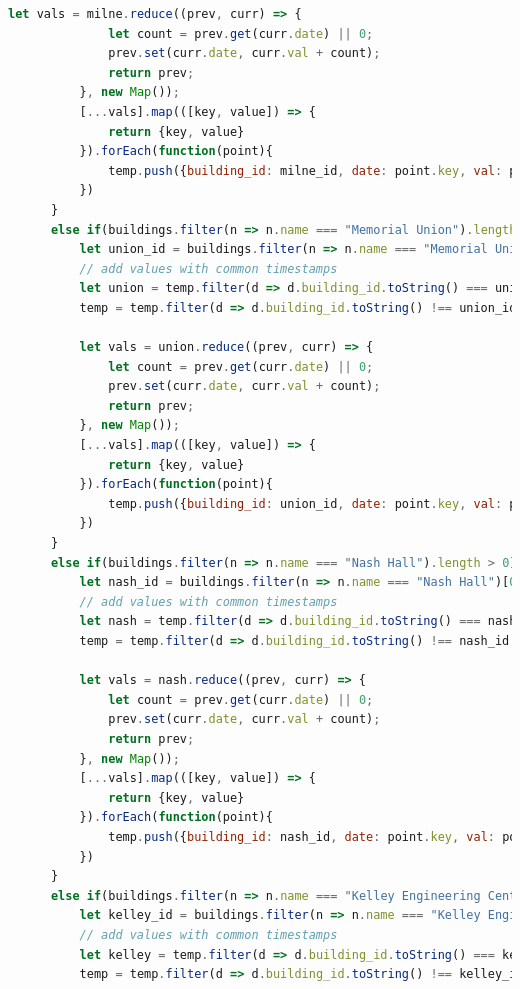 \documentclass[letterpaper,10pt,serif,draftclsnofoot,onecolumn,compsoc,titlepage]{IEEEtran}
\begin{document}
\begin{lstlisting}[language=JavaScript]
          let vals = milne.reduce((prev, curr) => {
              let count = prev.get(curr.date) || 0;
              prev.set(curr.date, curr.val + count);
              return prev;
          }, new Map());
          [...vals].map(([key, value]) => {
              return {key, value}
          }).forEach(function(point){
              temp.push({building_id: milne_id, date: point.key, val: point.value})
          })
      }
      else if(buildings.filter(n => n.name === "Memorial Union").length > 0){
          let union_id = buildings.filter(n => n.name === "Memorial Union")[0].building_id;
          // add values with common timestamps
          let union = temp.filter(d => d.building_id.toString() === union_id.toString());
          temp = temp.filter(d => d.building_id.toString() !== union_id.toString());

          let vals = union.reduce((prev, curr) => {
              let count = prev.get(curr.date) || 0;
              prev.set(curr.date, curr.val + count);
              return prev;
          }, new Map());
          [...vals].map(([key, value]) => {
              return {key, value}
          }).forEach(function(point){
              temp.push({building_id: union_id, date: point.key, val: point.value})
          })
      }
      else if(buildings.filter(n => n.name === "Nash Hall").length > 0){
          let nash_id = buildings.filter(n => n.name === "Nash Hall")[0].building_id;
          // add values with common timestamps
          let nash = temp.filter(d => d.building_id.toString() === nash_id.toString());
          temp = temp.filter(d => d.building_id.toString() !== nash_id.toString());

          let vals = nash.reduce((prev, curr) => {
              let count = prev.get(curr.date) || 0;
              prev.set(curr.date, curr.val + count);
              return prev;
          }, new Map());
          [...vals].map(([key, value]) => {
              return {key, value}
          }).forEach(function(point){
              temp.push({building_id: nash_id, date: point.key, val: point.value})
          })
      }
      else if(buildings.filter(n => n.name === "Kelley Engineering Center").length > 0){
          let kelley_id = buildings.filter(n => n.name === "Kelley Engineering Center")[0].building_id;
          // add values with common timestamps
          let kelley = temp.filter(d => d.building_id.toString() === kelley_id.toString());
          temp = temp.filter(d => d.building_id.toString() !== kelley_id.toString());


\end{lstlisting}
\end{document}
